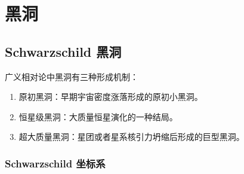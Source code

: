 \section{黑洞}

\subsection{Schwarzschild 黑洞}

广义相对论中黑洞有三种形成机制：
\begin{enumerate}[label=(\arabic*)]
    \item 原初黑洞：早期宇宙密度涨落形成的原初小黑洞。
    \item 恒星级黑洞：大质量恒星演化的一种结局。
    \item 超大质量黑洞：星团或者星系核引力坍缩后形成的巨型黑洞。
\end{enumerate}

\subsubsection{Schwarzschild 坐标系}
